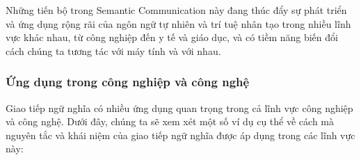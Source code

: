\documentclass{article} %
\begin{document}
Những tiến bộ trong Semantic Communication này đang thúc đẩy sự phát triển và ứng dụng rộng rãi của ngôn ngữ tự nhiên và trí tuệ nhân tạo trong nhiều lĩnh vực khác nhau, từ công nghiệp đến y tế và giáo dục, và có tiềm năng biến đổi cách chúng ta tương tác với máy tính và với nhau.


\subsubsection{Ứng dụng trong công nghiệp và công nghệ}

Giao tiếp ngữ nghĩa có nhiều ứng dụng quan trọng trong cả lĩnh vực công nghiệp và công nghệ. Dưới đây, chúng ta sẽ xem xét một số ví dụ cụ thể về cách mà nguyên tắc và khái niệm của giao tiếp ngữ nghĩa được áp dụng trong các lĩnh vực này:

\begin{itemize}


\end{itemize}
\end{document}
